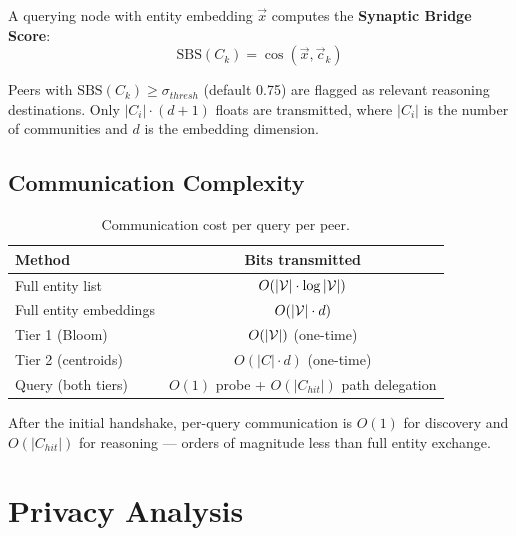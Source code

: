 \documentclass[10pt,twocolumn]{article}
\begin{document}
A querying node with entity embedding $\vec{x}$ computes the \textbf{Synaptic Bridge Score}:
\begin{equation}
\mathrm{SBS}(C_k) = \cos(\vec{x}, \vec{c}_k)
\label{eq:sbs}
\end{equation}

Peers with $\mathrm{SBS}(C_k) \geq \sigma_{thresh}$ (default 0.75) are flagged as
relevant reasoning destinations. Only $|C_i| \cdot (d + 1)$ floats are transmitted,
where $|C_i|$ is the number of communities and $d$ is the embedding dimension.

\subsection{Communication Complexity}

\begin{table}[h]
\small\centering
\caption{Communication cost per query per peer.}
\label{tab:comm}
\begin{tabular}{lc}
\toprule
\textbf{Method} & \textbf{Bits transmitted} \\
\midrule
Full entity list       & $O(|\mathcal{V}| \cdot \log|\mathcal{V}|)$ \\
Full entity embeddings & $O(|\mathcal{V}| \cdot d)$ \\
\midrule
Tier 1 (Bloom)         & $O(|\mathcal{V}|)$ (one-time) \\
Tier 2 (centroids)     & $O(|C| \cdot d)$ (one-time) \\
Query (both tiers)     & $O(1)$ probe + $O(|C_{hit}|)$ path delegation \\
\bottomrule
\end{tabular}
\end{table}

After the initial handshake, per-query communication is $O(1)$ for discovery and
$O(|C_{hit}|)$ for reasoning — orders of magnitude less than full entity exchange.

\section{Privacy Analysis}
\label{sec:privacy}
\end{document}
